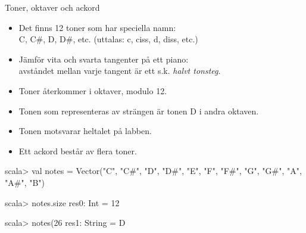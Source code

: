\begin{Slide}{Toner, oktaver och ackord}\SlideFontSmall
\begin{itemize}
\item Det finns 12 toner som har speciella namn: \\ C, C\#, D, D\#, etc. (uttalas: c, ciss, d, diss, etc.)
\item Jämför vita och svarta tangenter på ett piano: \\ avståndet mellan varje tangent är ett s.k. \emph{halvt tonsteg}. 
\item Toner återkommer i oktaver, modulo 12.
\item Tonen som representeras av strängen  är tonen D i andra oktaven.
\item Tonen  motsvarar heltalet  på labben.
\item Ett ackord består av flera toner.
\end{itemize}
\begin{REPL}[basicstyle=\color{white}\ttfamily\SlideFontSize{6}{7}\selectfont]
scala> val notes = Vector("C", "C#", "D", "D#", "E", "F", "F#", "G", "G#", "A", "A#", "B")

scala> notes.size
res0: Int = 12

scala> notes(26 %
res1: String = D

\end{REPL}
\end{Slide}

